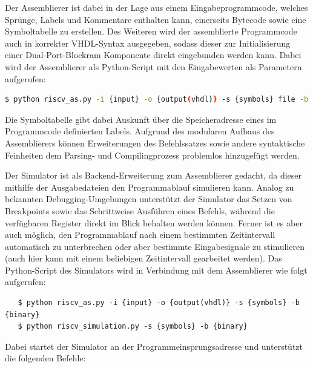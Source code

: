 
Der Assemblierer ist dabei in der Lage aus einem Eingabeprogrammcode, welches Spr\"unge, Labels und Kommentare enthalten kann, einerseits Bytecode sowie eine Symboltabelle zu erstellen. Des Weiteren wird der assemblierte Programmcode auch in korrekter VHDL-Syntax ausgegeben, sodass dieser zur Initialisierung einer Dual-Port-Blockram Komponente direkt eingebunden werden kann. Dabei wird der Assemblierer als Python-Script mit den Eingabewerten als Parametern aufgerufen:

\begin{lstlisting}[language=bash]
   $ python riscv_as.py -i {input} -o {output(vhdl)} -s {symbols} file -b {binary}
\end{lstlisting}

Die Symboltabelle gibt dabei Auskunft \"uber die Speicheradresse eines im Programmcode definierten Labels. Aufgrund des modularen Aufbaus des Assemblierers k\"onnen Erweiterungen des Befehlssatzes sowie andere syntaktische Feinheiten dem Parsing- und Compilingprozess problemlos hinzugef\"ugt werden.

 
Der Simulator ist als Backend-Erweiterung zum Assemblierer gedacht, da dieser mithilfe der Ausgabedateien den Programmablauf simulieren kann. Analog zu bekannten Debugging-Umgebungen unterst\"utzt der Simulator das Setzen von Breakpoints sowie das Schrittweise Ausf\"uhren eines Befehls, w\"ahrend die verf\"ugbaren Register direkt im Blick behalten werden k\"onnen. Ferner ist es aber auch m\"oglich, den Programmablauf nach einem bestimmten Zeitintervall automatisch zu unterbrechen oder aber bestimmte Eingabesignale zu stimulieren (auch hier kann mit einem beliebigen Zeitintervall gearbeitet werden). Das Python-Script des Simulators wird in Verbindung mit dem Assemblierer wie folgt aufgerufen:

\begin{lstlisting}
   $ python riscv_as.py -i {input} -o {output(vhdl)} -s {symbols} -b {binary}
   $ python riscv_simulation.py -s {symbols} -b {binary}
\end{lstlisting}

Dabei startet der Simulator an der Programmeinsprungsadresse und unterst\"utzt die folgenden Befehle:

